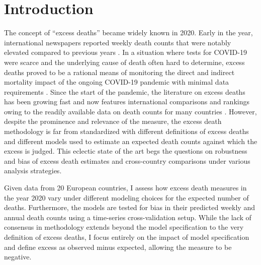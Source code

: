 \documentclass[10pt,letterpaper]{article}
\begin{document}
\linenumbers


\section*{Introduction}

The concept of ``excess deaths'' became widely known in 2020. Early in the year, international newspapers reported weekly death counts that were notably elevated compared to previous years \cite{EDT2020, NYT2020}. In a situation where tests for COVID-19 were scarce and the underlying cause of death often hard to determine, excess deaths proved to be a rational means of monitoring the direct and indirect mortality impact of the ongoing COVID-19 pandemic with minimal data requirements \cite{Leon2020}.
Since the start of the pandemic, the literature on excess deaths has been growing fast and now features international comparisons and rankings owing to the readily available data on death counts for many countries \cite{Kontis2020, Bilinski2020, Rizzi2021, Islam2021, Noergaard2021, Arolas2021}.
However, despite the prominence and relevance of the measure, the excess death methodology is far from standardized with different definitions of excess deaths and different models used to estimate an expected death counts against which the excess is judged. This eclectic state of the art begs the questions on robustness and bias of excess death estimates and cross-country comparisons under various analysis strategies.

Given data from 20 European countries, I assess how excess death measures in the year 2020 vary under different modeling choices for the expected number of deaths. Furthermore, the models are tested for bias in their predicted weekly and annual death counts using a time-series cross-validation setup. While the lack of consensus in methodology extends beyond the model specification to the very definition of excess deaths, I focus entirely on the impact of model specification and define excess as observed minus expected, allowing the measure to be negative.
\end{document}
